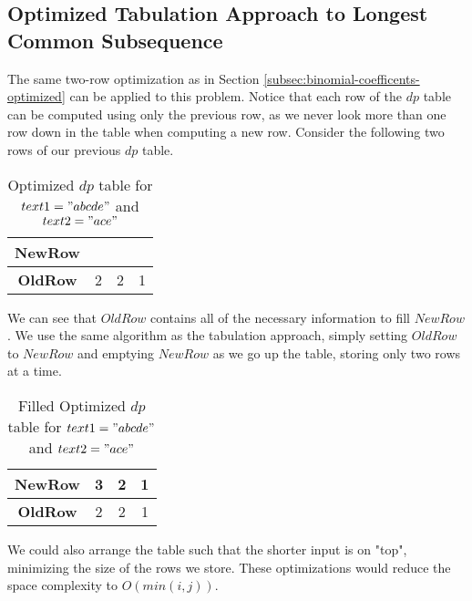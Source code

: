 \subsection{Optimized Tabulation Approach to Longest Common Subsequence}\label{subsec:lcs-optimized}
The same two-row optimization as in Section \ref{subsec:binomial-coefficents-optimized} can be applied to this problem.
Notice that each row of the $dp$ table can be computed using only the previous row, as we never look more than one row down in the table when computing a new row.
Consider the following two rows of our previous $dp$ table.
\begin{table}[H]
    \centering
    \begin{tabular}{|c|c|c|c|}
        \hline
        \textbf{NewRow} & $\phantom{0}$ & $\phantom{0}$ & $\phantom{0}$ \\
        \hline
        \textbf{OldRow} & 2 & 2 & 1  \\
        \hline
    \end{tabular}
    \caption{Optimized $dp$ table for $text1="abcde"$ and $text2="ace"$}
\end{table}

We can see that $OldRow$ contains all of the necessary information to fill $NewRow$.
We use the same algorithm as the tabulation approach, simply setting $OldRow$ to $NewRow$ and emptying $NewRow$ as we go up the table,
storing only two rows at a time.

\begin{table}[H]
    \centering
    \begin{tabular}{|c|c|c|c|}
        \hline
        \textbf{NewRow} & 3 & 2 & 1 \\
        \hline
        \textbf{OldRow} & 2 & 2 & 1  \\
        \hline
    \end{tabular}
    \caption{Filled Optimized $dp$ table for $text1="abcde"$ and $text2="ace"$}
\end{table}

We could also arrange the table such that the shorter input is on "top", minimizing the size of the rows we store. These optimizations would reduce the space complexity to $O(min(i,j))$.



